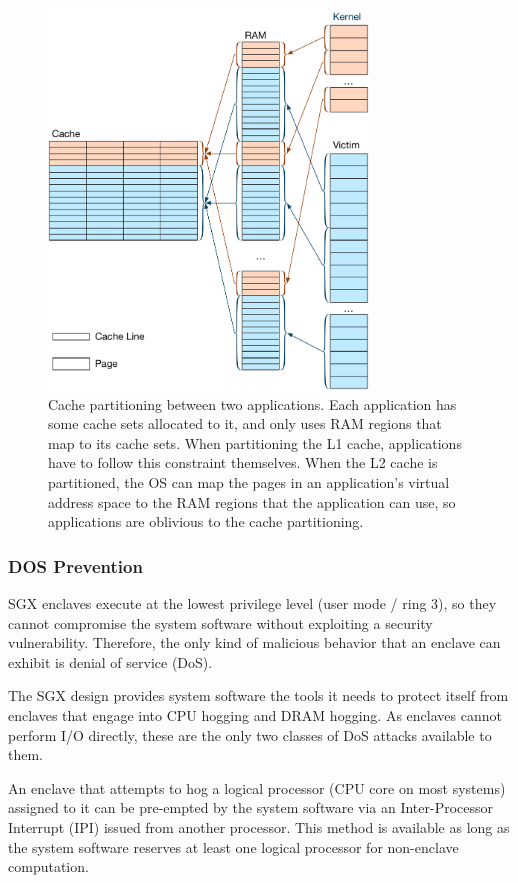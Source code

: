 \begin{figure}[hbt]
  \centering
  \includegraphics[width=85mm]{figures/cache_partitions.pdf}
  \caption{
    Cache partitioning between two applications. Each application has some
    cache sets allocated to it, and only uses RAM regions that map to its cache
    sets. When partitioning the L1 cache, applications have to follow this
    constraint themselves. When the L2 cache is partitioned, the OS can map the
    pages in an application's virtual address space to the RAM regions that the
    application can use, so applications are oblivious to the cache
    partitioning.
  }
  \label{fig:cache_partitions}
\end{figure}


\subsubsection{DOS Prevention}

SGX enclaves execute at the lowest privilege level (user mode / ring 3), so
they cannot compromise the system software without exploiting a security
vulnerability. Therefore, the only kind of malicious behavior that an enclave
can exhibit is denial of service (DoS).

The SGX design provides system software the tools it needs to protect itself
from enclaves that engage into CPU hogging and DRAM hogging. As enclaves cannot
perform I/O directly, these are the only two classes of DoS attacks available
to them.

An enclave that attempts to hog a logical processor (CPU core on most systems)
assigned to it can be pre-empted by the system software via an Inter-Processor
Interrupt (IPI) issued from another processor. This method is available as long
as the system software reserves at least one logical processor for non-enclave
computation.

